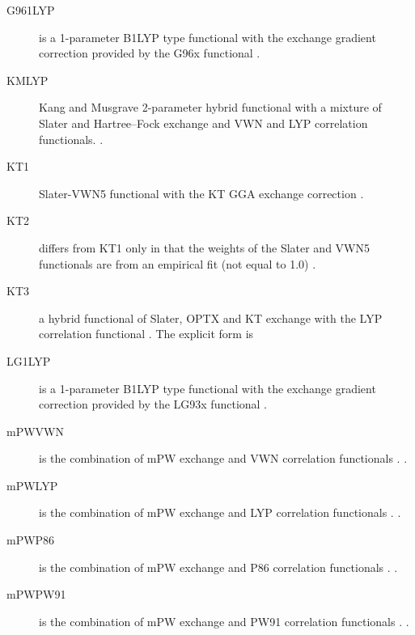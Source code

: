 \begin{description}
\item[G961LYP] is a 1-parameter B1LYP type functional with the exchange gradient 
  correction provided by the G96x functional \cite{dft:g961lyp}.

\item[KMLYP] Kang and Musgrave 2-parameter hybrid functional with a mixture of
  Slater and Hartree--Fock exchange and VWN and LYP correlation functionals.
  \cite{dft:kmlyp}.

\item[KT1] Slater-VWN5 functional with the KT GGA exchange correction
  \cite{dft:kt12,dft:kt12a}.

\item[KT2] differs from KT1 only in that the weights of the Slater and
  VWN5 functionals are from an empirical fit (not equal to 1.0)
  \cite{dft:kt12,dft:kt12a}.

\item[KT3] a hybrid functional of Slater, OPTX and KT exchange with the
  LYP correlation functional \cite{dft:kt3}. The explicit form is

\item[LG1LYP] is a 1-parameter B1LYP type functional with the exchange gradient
  correction provided by the LG93x functional \cite{dft:g961lyp}.

\item[mPWVWN] is the combination of mPW exchange and VWN correlation functionals 
   \cite{dft:mpw,dft:vwn}.
  .

\item[mPWLYP] is the combination of mPW exchange and LYP correlation functionals 
   \cite{dft:mpw,dft:vwn}.
  .

\item[mPWP86] is the combination of mPW exchange and P86 correlation functionals 
   \cite{dft:mpw,dft:vwn}.
  .

\item[mPWPW91] is the combination of mPW exchange and PW91 correlation functionals 
   \cite{dft:mpw,dft:pw91}.
  .


\end{description}
